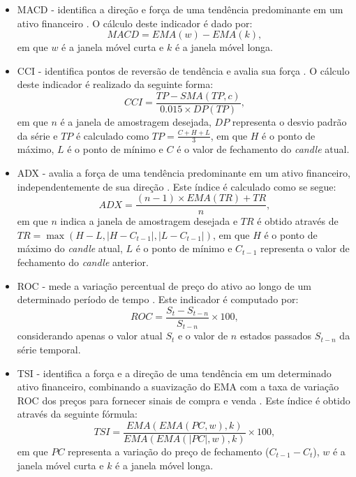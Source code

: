 \begin{itemize}
    \item \ac{MACD} - identifica a direção e força de uma tendência predominante em um ativo financeiro \cite{C_Veeramani_Exploration}. O cálculo deste indicador é dado por: 
    \begin{equation}
        \label{eq:MACD}
        MACD = EMA(w) - EMA(k),
    \end{equation}
    em que $w$ é a janela móvel curta e $k$ é a janela móvel longa.
    
    \item \ac{CCI} - identifica pontos de reversão de tendência e avalia sua força \cite{altan2019effect, halil2019predicting}. O cálculo deste indicador é realizado da seguinte forma:
    \begin{equation}
        \label{eq:CCI}
        CCI = \frac{TP - SMA(TP,c)}{0.015 \times DP(TP)},
    \end{equation}
    em que $n$ é a janela de amostragem desejada, $DP$ representa o desvio padrão da série e $TP$ é calculado como $TP = \frac{C+H+L}{3}$, em que $H$ é o ponto de máximo, $L$ é o ponto de mínimo e $C$ é o valor de fechamento do \textit{candle} atual. 
    
    \item \ac{ADX} - avalia a força de uma tendência predominante em um ativo financeiro, independentemente de sua direção \cite{gao2021stock}. Este índice é calculado como se segue: 
    \begin{equation}
        \label{eq:ADX}
        ADX = \frac{(n-1) \times EMA(TR) + TR}{n},
    \end{equation}
    em que $n$ indica a janela de amostragem desejada e $TR$ é obtido através de $TR = \max(H-L, |H-C_{t-1}|, |L-C_{t-1}|)$, em que $H$ é o ponto de máximo do \textit{candle} atual, $L$ é o ponto de mínimo e $C_{t-1}$ representa o valor de fechamento do \textit{candle} anterior.
    
    \item \ac{ROC} - mede a variação percentual de preço do ativo ao longo de um determinado período de tempo \cite{ampomah2020evaluation, jiang2020improved}. Este indicador é computado por: 
    \begin{equation}
        \label{eq:ROC}
        ROC = \frac{S_{t}-S_{t-n}}{S_{t-n}} \times 100,
    \end{equation}
    considerando apenas o valor atual $S_t$ e o valor de $n$ estados passados $S_{t-n}$ da série temporal.
    
    \item \ac{TSI} - identifica a força e a direção de uma tendência em um determinado ativo financeiro, combinando a suavização do \ac{EMA} com a taxa de variação \ac{ROC} dos preços para fornecer sinais de compra e venda \cite{anwar2019forecasting}. Este índice é obtido através da seguinte fórmula:     
    \begin{equation}
        \label{eq:TSI}
        TSI = \frac{EMA(EMA(PC,w), k)}{EMA(EMA(|PC|,w), k)} \times 100,
    \end{equation}
    em que $PC$ representa a variação do preço de fechamento ($C_{t-1} - C_t$), $w$ é a janela móvel curta e $k$ é a janela móvel longa.
    

\end{itemize}
